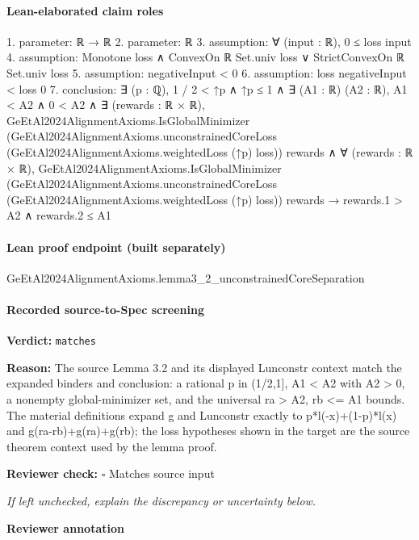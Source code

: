 \documentclass[10pt]{article}
\newcommand{\reviewerbox}{%
  \par\noindent\fbox{\parbox{0.96\linewidth}{\rule{0pt}{0.38in}}}\par
}
\newcommand{\reviewmatch}[1]{%
  \par\noindent\textbf{Reviewer check:} $\square$\; #1\par
  \noindent\emph{If left unchecked, explain the discrepancy or uncertainty below.}\par
}
\begin{document}
\paragraph{Lean-elaborated claim roles}\begin{ReviewVerbatim}
1. parameter: ℝ → ℝ
2. parameter: ℝ
3. assumption: ∀ (input : ℝ), 0 ≤ loss input
4. assumption: Monotone loss ∧ ConvexOn ℝ Set.univ loss ∨ StrictConvexOn ℝ Set.univ loss
5. assumption: negativeInput < 0
6. assumption: loss negativeInput < loss 0
7. conclusion: ∃ (p : ℚ),
  1 / 2 < ↑p ∧
    ↑p ≤ 1 ∧
      ∃ (A1 : ℝ) (A2 : ℝ),
        A1 < A2 ∧
          0 < A2 ∧
            ∃ (rewards : ℝ × ℝ),
              GeEtAl2024AlignmentAxioms.IsGlobalMinimizer
                  (GeEtAl2024AlignmentAxioms.unconstrainedCoreLoss (GeEtAl2024AlignmentAxioms.weightedLoss (↑p) loss))
                  rewards ∧
                ∀ (rewards : ℝ × ℝ),
                  GeEtAl2024AlignmentAxioms.IsGlobalMinimizer
                      (GeEtAl2024AlignmentAxioms.unconstrainedCoreLoss
                        (GeEtAl2024AlignmentAxioms.weightedLoss (↑p) loss))
                      rewards →
                    rewards.1 > A2 ∧ rewards.2 ≤ A1
\end{ReviewVerbatim}

\paragraph{Lean proof endpoint (built separately)}\begin{ReviewVerbatim}
GeEtAl2024AlignmentAxioms.lemma3_2_unconstrainedCoreSeparation
\end{ReviewVerbatim}

\paragraph{Recorded source-to-Spec screening}
\textbf{Verdict:} \texttt{matches}
\\
{\raggedright
\textbf{Reason:} The source Lemma 3.\allowbreak{}2 and its displayed Lunconstr context match the expanded binders and conclusion:\allowbreak{} a rational p in (1/\allowbreak{}2,1], A1 < A2 with A2 > 0, a nonempty global-\allowbreak{}minimizer set, and the universal ra > A2, rb <= A1 bounds.\allowbreak{}  The material definitions expand g and Lunconstr exactly to p*l(-\allowbreak{}x)+(1-\allowbreak{}p)*l(x) and g(ra-\allowbreak{}rb)+g(ra)+g(rb);\allowbreak{} the loss hypotheses shown in the target are the source theorem context used by the lemma proof.\allowbreak{}
\par}
\reviewmatch{Matches source input}
\noindent\textbf{Reviewer annotation}\par
\reviewerbox
\clearpage
\hypertarget{source-claim-df13a69840ea5ff9}{}
\end{document}
